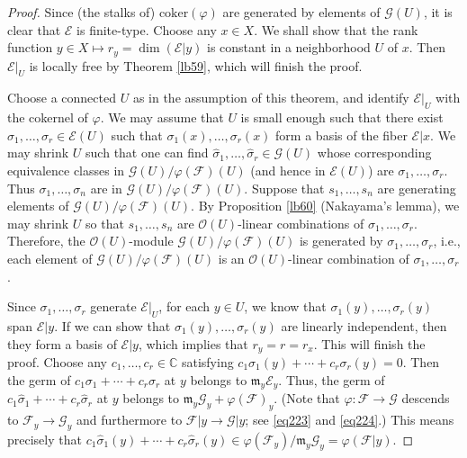 \documentclass[12pt,a4paper,notitlepage]{report}
\theoremstyle{definition}
\theoremstyle{plain}
\newcommand{\fk}{\mathfrak}
\newcommand{\wht}{\widehat}
\newcommand{\scr}{\mathscr}
\newcommand{\coker}{\mathrm{coker}}
\newcommand{\Cbb}{\mathbb C}
\numberwithin{equation}{section}
\begin{document}
\begin{proof}
Since (the stalks of) $\coker(\varphi)$ are generated by elements of $\scr G(U)$, it is clear that $\scr E$ is finite-type. Choose any $x\in X$. We shall show that the rank function $y\in X\mapsto r_y=\dim(\scr E|y)$ is  constant in a neighborhood $U$ of $x$. Then $\scr E|_U$ is locally free by Theorem \ref{lb59}, which will finish the proof.

Choose a connected $U$ as in the assumption of this theorem, and identify $\scr E|_U$ with the cokernel of $\varphi$.   We may assume that $U$ is small enough such that there exist $\sigma_1,\dots,\sigma_r\in\scr E(U)$ such that $\sigma_1(x),\dots,\sigma_r(x)$ form a basis of the fiber $\scr E|x$. We may shrink $U$ such that one can find $\wht\sigma_1,\dots,\wht\sigma_r\in\scr G(U)$ whose corresponding equivalence classes in $\scr G(U)/\varphi(\scr F)(U)$ (and hence in $\scr E(U)$) are $\sigma_1,\dots,\sigma_r$. Thus $\sigma_1,\dots,\sigma_n$ are in $\scr G(U)/\varphi(\scr F)(U)$. Suppose that $s_1,\dots,s_n$ are generating elements of $\scr G(U)/\varphi(\scr F)(U)$. By Proposition \ref{lb60} (Nakayama's lemma), we may shrink $U$ so that $s_1,\dots,s_n$ are $\scr O(U)$-linear combinations of $\sigma_1,\dots,\sigma_r$. Therefore, the $\scr O(U)$-module $\scr G(U)/\varphi(\scr F)(U)$ is generated by $\sigma_1,\dots,\sigma_r$, i.e., each element of $\scr G(U)/\varphi(\scr F)(U)$ is an $\scr O(U)$-linear combination of $\sigma_1,\dots,\sigma_r$.

Since $\sigma_1,\dots,\sigma_r$ generate   $\scr E|_U$, for each $y\in U$, we know that $\sigma_1(y),\dots,\sigma_r(y)$ span $\scr E|y$. If we can show that $\sigma_1(y),\dots,\sigma_r(y)$ are linearly independent, then they form a basis of $\scr E|y$, which implies that $r_y=r=r_x$. This will finish the proof. Choose any $c_1,\dots,c_r\in\Cbb$ satisfying  $c_1\sigma_1(y)+\cdots+c_r\sigma_r(y)=0$. Then the germ of $c_1\sigma_1+\cdots+c_r\sigma_r$ at $y$ belongs to $\fk m_y\scr E_y$. Thus, the germ of $c_1\wht \sigma_1+\cdots+c_r\wht \sigma_r$ at $y$ belongs to $\fk m_y\scr G_y+\varphi(\scr F)_y$. (Note that $\varphi:\scr F\rightarrow\scr G$ descends to $\scr F_y\rightarrow \scr G_y$ and furthermore to $\scr F|y\rightarrow\scr G|y$; see \eqref{eq223} and \eqref{eq224}.) This means precisely that $c_1\wht \sigma_1(y)+\cdots+c_r\wht \sigma_r(y)\in\varphi(\scr F_y)/\fk m_y\scr G_y=\varphi(\scr F|y)$. 


\end{proof}
\end{document}

